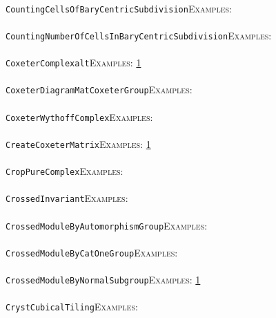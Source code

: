 \documentclass[a4paper,11pt]{report}
\begin{document}
{{ \\
 \texttt{CountingCellsOfBaryCentricSubdivision}{\nobreakspace}{\nobreakspace}{\nobreakspace}{\nobreakspace}\textsc{Examples:} \\
 \\
 \texttt{CountingNumberOfCellsInBaryCentricSubdivision}{\nobreakspace}{\nobreakspace}{\nobreakspace}{\nobreakspace}\textsc{Examples:} \\
 \\
 \texttt{CoxeterComplex{\textunderscore}alt}{\nobreakspace}{\nobreakspace}{\nobreakspace}{\nobreakspace}\textsc{Examples:} \href{tutorial/chap6.html} {1}{\nobreakspace} \\
 \\
 \texttt{CoxeterDiagramMatCoxeterGroup}{\nobreakspace}{\nobreakspace}{\nobreakspace}{\nobreakspace}\textsc{Examples:} \\
 \\
 \texttt{CoxeterWythoffComplex}{\nobreakspace}{\nobreakspace}{\nobreakspace}{\nobreakspace}\textsc{Examples:} \\
 \\
 \texttt{CreateCoxeterMatrix}{\nobreakspace}{\nobreakspace}{\nobreakspace}{\nobreakspace}\textsc{Examples:} \href{../www/SideLinks/About/aboutDavisComplex.html} {1}{\nobreakspace} \\
 \\
 \texttt{CropPureComplex}{\nobreakspace}{\nobreakspace}{\nobreakspace}{\nobreakspace}\textsc{Examples:} \\
 \\
 \texttt{CrossedInvariant}{\nobreakspace}{\nobreakspace}{\nobreakspace}{\nobreakspace}\textsc{Examples:} \\
 \\
 \texttt{CrossedModuleByAutomorphismGroup}{\nobreakspace}{\nobreakspace}{\nobreakspace}{\nobreakspace}\textsc{Examples:} \\
 \\
 \texttt{CrossedModuleByCatOneGroup}{\nobreakspace}{\nobreakspace}{\nobreakspace}{\nobreakspace}\textsc{Examples:} \\
 \\
 \texttt{CrossedModuleByNormalSubgroup}{\nobreakspace}{\nobreakspace}{\nobreakspace}{\nobreakspace}\textsc{Examples:} \href{../www/SideLinks/About/aboutNonabelian.html} {1}{\nobreakspace} \\
 \\
 \texttt{CrystCubicalTiling}{\nobreakspace}{\nobreakspace}{\nobreakspace}{\nobreakspace}\textsc{Examples:} \\
}}
\end{document}
